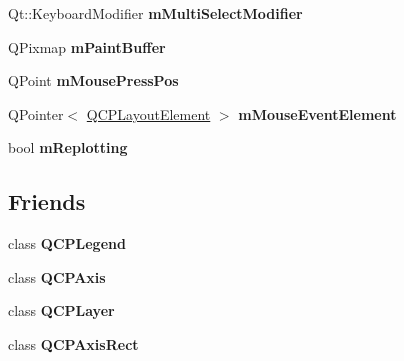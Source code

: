 \begin{DoxyCompactItemize}
\item 
Qt\+::\+Keyboard\+Modifier {\bfseries m\+Multi\+Select\+Modifier}\hypertarget{classQCustomPlot_a0e97e701c5671e7e463d2ce0211d0f8a}{}\label{classQCustomPlot_a0e97e701c5671e7e463d2ce0211d0f8a}

\item 
Q\+Pixmap {\bfseries m\+Paint\+Buffer}\hypertarget{classQCustomPlot_a753630df96e0672098d9e88bd41d1913}{}\label{classQCustomPlot_a753630df96e0672098d9e88bd41d1913}

\item 
Q\+Point {\bfseries m\+Mouse\+Press\+Pos}\hypertarget{classQCustomPlot_ac57090da95056ae4dd67be67adfa85bd}{}\label{classQCustomPlot_ac57090da95056ae4dd67be67adfa85bd}

\item 
Q\+Pointer$<$ \hyperlink{classQCPLayoutElement}{Q\+C\+P\+Layout\+Element} $>$ {\bfseries m\+Mouse\+Event\+Element}\hypertarget{classQCustomPlot_a2f2e8b25e59cf3cf7b15e4767c02e747}{}\label{classQCustomPlot_a2f2e8b25e59cf3cf7b15e4767c02e747}

\item 
bool {\bfseries m\+Replotting}\hypertarget{classQCustomPlot_ab30daeca6612c3948afd368dce5f1c39}{}\label{classQCustomPlot_ab30daeca6612c3948afd368dce5f1c39}

\end{DoxyCompactItemize}
\subsection*{Friends}
\begin{DoxyCompactItemize}
\item 
class {\bfseries Q\+C\+P\+Legend}\hypertarget{classQCustomPlot_a8429035e7adfbd7f05805a6530ad5e3b}{}\label{classQCustomPlot_a8429035e7adfbd7f05805a6530ad5e3b}

\item 
class {\bfseries Q\+C\+P\+Axis}\hypertarget{classQCustomPlot_af123edeca169ec7a31958a1d714e1a8a}{}\label{classQCustomPlot_af123edeca169ec7a31958a1d714e1a8a}

\item 
class {\bfseries Q\+C\+P\+Layer}\hypertarget{classQCustomPlot_a5dbf96bf7664c1b6fce49063eeea6eef}{}\label{classQCustomPlot_a5dbf96bf7664c1b6fce49063eeea6eef}

\item 
class {\bfseries Q\+C\+P\+Axis\+Rect}\hypertarget{classQCustomPlot_acbf20ecb140f66c5fd1bc64ae0762990}{}\label{classQCustomPlot_acbf20ecb140f66c5fd1bc64ae0762990}

\end{DoxyCompactItemize}


